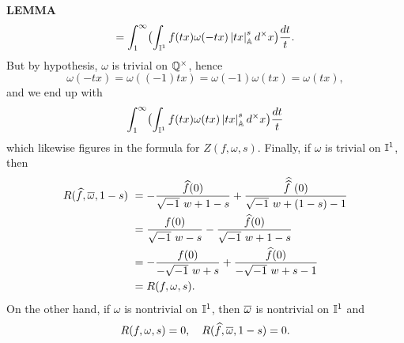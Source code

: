 \begin{x}{\small\bf LEMMA}
\[= \int_1^\infty \bigl(\int_{\mathbb{I}^1} f(tx) \omega(-tx) \left\vert tx\right\vert_{\mathbb{A}}^s d^\times x\bigr) \frac{dt}{t}.
\]
But by hypothesis, $\omega$ is trivial on $\mathbb{Q}^\times$, hence
\[
\omega(-tx) = \omega((-1)tx) = \omega(-1) \omega(tx) = \omega(tx),
\]
and we end up with 
\[
 \int_1^\infty \bigl(\int_{\mathbb{I}^1} f(tx) \omega(tx) \left\vert tx\right\vert_{\mathbb{A}}^s d^\times x\bigr) \frac{dt}{t}
\]
which likewise figures in the formula for $Z(f,\omega,s)$.  
Finally, if $\omega$ is trivial on $\mathbb{I}^1$, then
\\
\begin{align*}
R(\widehat{f},\overline{\omega},1-s) \   	
&= -\frac{\widehat{f}(0)}{\sqrt{-1} \ w + 1 - s} +  \frac{\widehat{\widehat{f}\hspace{0.125cm}}(0)}{\sqrt{-1} \ w + (1 - s) - 1}\\
&= \frac{f(0)}{\sqrt{-1}\  w - s} -  \frac{\widehat{f}(0)}{\sqrt{-1} \ w + 1 - s}\\
&= -\frac{f(0)}{-\sqrt{-1}\  w + s} +  \frac{\widehat{f}(0)}{-\sqrt{-1}\  w + s - 1}\\
&= R(f,\omega,s).
\end{align*}
On the other hand, if $\omega$ is nontrivial on $\mathbb{I}^1$, then $\overline{\omega}$ is nontrivial on $\mathbb{I}^1$ and 
\[
R(f,\omega,s) = 0, \quad R(\widehat{f},\overline{\omega},1-s) = 0.
\]
\end{x}





















